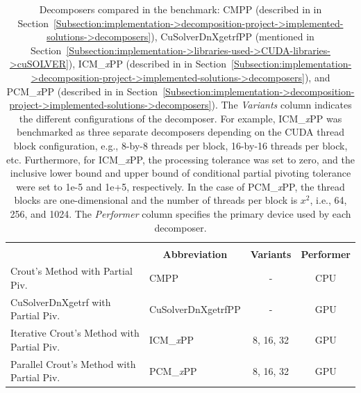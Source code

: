 \begin{table}[ht!]
	\centering
	\begin{tabular}{|ll|c|c|}
		\hline
		\rowcolor[HTML]{C0C0C0} 
		\multicolumn{2}{|c|}{\cellcolor[HTML]{C0C0C0}\textbf{Decomposer}} & \cellcolor[HTML]{C0C0C0} & \multicolumn{1}{c|}{\cellcolor[HTML]{C0C0C0}} \\
		\rowcolor[HTML]{EFEFEF} 
		\multicolumn{1}{|c|}{\cellcolor[HTML]{EFEFEF}\textbf{Name}} & \multicolumn{1}{c|}{\cellcolor[HTML]{EFEFEF}\textbf{Abbreviation}} & \multirow{-2}{*}{\cellcolor[HTML]{C0C0C0}\textbf{Variants}} & \multicolumn{1}{c|}{\multirow{-2}{*}{\cellcolor[HTML]{C0C0C0}\textbf{Performer}}} \\ \hline
		\multicolumn{1}{|l|}{Crout's Method with Partial Piv.}           & CMPP               &     -     & CPU \\
		\multicolumn{1}{|l|}{CuSolverDnXgetrf with Partial Piv.}         & CuSolverDnXgetrfPP &     -     & GPU \\
		\multicolumn{1}{|l|}{Iterative Crout's Method with Partial Piv.} & ICM\_\textit{x}PP  & 8, 16, 32 & GPU \\
		\multicolumn{1}{|l|}{Parallel Crout's Method with Partial Piv.}  & PCM\_\textit{x}PP  & 8, 16, 32 & GPU \\ \hline
	\end{tabular}
	\caption{Decomposers compared in the benchmark: CMPP (described in  in Section~\ref{Subsection:implementation->decomposition-project->implemented-solutions->decomposers}), CuSolverDnXgetrfPP (mentioned in Section~\ref{Subsection:implementation->libraries-used->CUDA-libraries->cuSOLVER}), ICM\_\textit{x}PP (described in  in Section~\ref{Subsection:implementation->decomposition-project->implemented-solutions->decomposers}), and PCM\_\textit{x}PP (described in  in Section~\ref{Subsection:implementation->decomposition-project->implemented-solutions->decomposers}).
		The \textit{Variants} column indicates the different configurations of the decomposer.
		For example, ICM\_\textit{x}PP was benchmarked as three separate decomposers depending on the CUDA thread block configuration, e.g., 8-by-8 threads per block, 16-by-16 threads per block, etc.
		Furthermore, for ICM\_\textit{x}PP, the processing tolerance was set to zero, and the inclusive lower bound and upper bound of conditional partial pivoting tolerance were set to 1e-5 and 1e+5, respectively.
		In the case of PCM\_\textit{x}PP, the thread blocks are one-dimensional and the number of threads per block is $x^2$, i.e., 64, 256, and 1024.
		The \textit{Performer} column specifies the primary device used by each decomposer.
	}
	\label{Table:comparing-decomposers-and-solvers->decomposition-project-benchmarks->decomposers-benchmark->table-of-decomposers}
\end{table}

